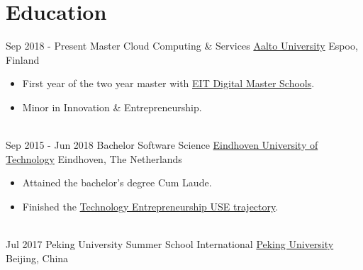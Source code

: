 \documentclass[letterpaper]{twentysecondcv} %
\begin{document}
\makeprofile %

\section{Education}

\begin{twenty} %
	\twentyitem
    	{Sep 2018 - }
        {Present}
        {Master Cloud Computing \& Services}
        {\href{https://aalto.fi/}{Aalto University}}
        {Espoo, Finland}
        {
        \begin{itemize}
            \item First year of the two year master with \href{https://masterschool.eitdigital.eu}{EIT Digital Master Schools}.
            \item Minor in Innovation \& Entrepreneurship.
        \end{itemize}
        }
    \\
    \twentyitem
    	{Sep 2015 - }
        {Jun 2018}
        {Bachelor Software Science}
        {\href{https://tue.nl/}{Eindhoven University of Technology}}
        {Eindhoven, The Netherlands}
        {
       	\begin{itemize}
   			\item Attained the bachelor's degree Cum Laude.
            \item Finished the \href{https://web.archive.org/web/20181111084550/https://educationguide.tue.nl/programs/bachelor-college/use-learning-trajectory/technology-entrepreneurship/}{Technology Entrepreneurship USE trajectory}.
		\end{itemize}
    	}
    \\
	\twentyitem
    	{Jul 2017}
		{}
        {Peking University Summer School International}
        {\href{http://www.oir.pku.edu.cn/summerschool/}{Peking University}}
        {Beijing, China}
        {
    	}
\end{twenty}
\end{document}
